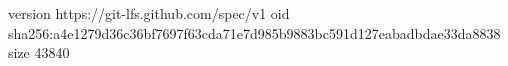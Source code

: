 version https://git-lfs.github.com/spec/v1
oid sha256:a4e1279d36c36bf7697f63cda71e7d985b9883bc591d127eabadbdae33da8838
size 43840

